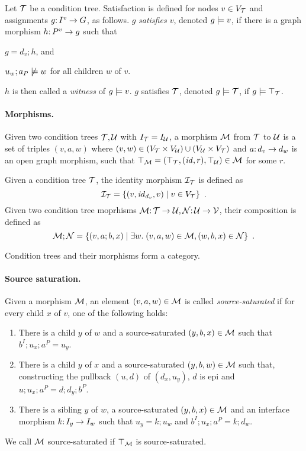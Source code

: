 Let ${\mathcal{T}}$ be a condition tree. Satisfaction is defined for nodes $v\in V_{\mathcal{T}}$ and assignments $g{:}\, I^v\rightarrow G$, as follows. $g$ \emph{satisfies $v$}, denoted $g\models v$, if there is a graph morphism $h{:}\, P^v\rightarrow g$ such that
\begin{inumerate}
\item $g=d_v;h$, and 
\item $u_w;a_P\not\models w$ for all children $w$ of $v$.
\end{inumerate}
$h$ is then called a \emph{witness} of $g\models v$.
$g$ satisfies ${\mathcal{T}}$, denoted $g\models{\mathcal{T}}$, if $g\models\top_{{\mathcal{T}}}$.

\paragraph{Morphisms.}

Given two condition trees ${\mathcal{T}},{\mathcal{U}}$ with $I_{\mathcal{T}}=I_{\mathcal{U}}$, a morphism ${\mathcal{M}}$ from ${\mathcal{T}}$ to ${\mathcal{U}}$ is a set of triples $(v,a,w)$ where $(v,w)\in (V_{\mathcal{T}}\times V_{\mathcal{U}})\cup (V_{\mathcal{U}}\times V_{\mathcal{T}})$ and $a{:}\, d_v\rightarrow d_w$ is an open graph morphism, such that $\top_{{\mathcal{M}}}=(\top_{{\mathcal{T}}},({\mathit{id}},r),\top_{{\mathcal{U}}})\in {\mathcal{M}}$ for some $r$.

Given a condition tree ${\mathcal{T}}$, the identity morphism ${\mathcal{I}}_{\mathcal{T}}$ is defined as
\[ {\mathcal{I}}_{\mathcal{T}} = \{{(v,{\mathit{id}}_{d_v},v)\mid v\in V_{\mathcal{T}}}\} \enspace. \]
Given two condition tree moprhisms ${\mathcal{M}}{:}\, {\mathcal{T}}\rightarrow {\mathcal{U}},{\mathcal{N}}{:}\, {\mathcal{U}}\rightarrow {\mathcal{V}}$, their composition is defined as
\[ {\mathcal{M}};{\mathcal{N}} = \{{(v,a;b,x) \mid \exists w.\; (v,a,w)\in {\mathcal{M}}, (w,b,x)\in {\mathcal{N}}}\} \enspace. \]

\begin{proposition}
Condition trees and their morphisms form a category.
\end{proposition}

\paragraph{Source saturation.}

Given a morphism ${\mathcal{M}}$, an element $(v,a,w)\in {\mathcal{M}}$ is called \emph{source-saturated} if for every child $x$ of $v$, one of the following holds:

\begin{enumerate}[label=(\alph*)]
\item There is a child $y$ of $w$ and a source-saturated $(y,b,x)\in{\mathcal{M}}$ such that $b^I;u_x;a^P=u_y$.
\item There is a child $y$ of $x$ and a source-saturated $(y,b,w)\in{\mathcal{M}}$ such that, constructing the pullback $(u,d)$ of $(d_x,u_y)$, $d$ is epi and $u;u_x;a^P=d;d_y;b^P$.
\item There is a sibling $y$ of $w$, a source-saturated $(y,b,x)\in{\mathcal{M}}$ and an interface morphism $k{:}\, I_y\rightarrow I_w$ such that $u_y=k;u_w$ and $b^I;u_x;a^P=k;d_w$.
\end{enumerate}
%
We call ${\mathcal{M}}$ source-saturated if $\top_{{\mathcal{M}}}$ is source-saturated.

